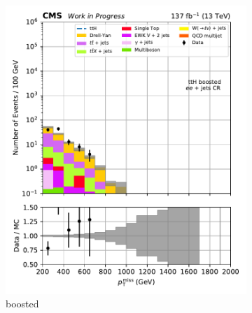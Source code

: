 \begin{figure}[htbp]
    \centering
    \begin{subfigure}[b]{0.24\textwidth}
        \includegraphics[width=\textwidth]{figures/region_plots/2016to18/region_4/ttH_boosted.pdf}
        \caption{\ttH boosted}
    \end{subfigure}
    \hfill
    \begin{subfigure}[b]{0.24\textwidth}

\end{subfigure}
\end{figure}
